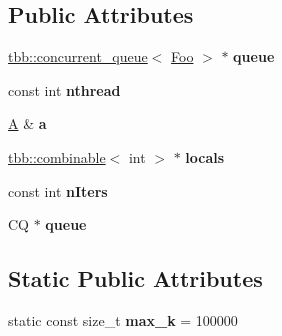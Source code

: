 \subsection*{Public Attributes}
\begin{DoxyCompactItemize}
\item 
\hypertarget{classBody_a8a064e323399c07b9484f6f0250fc070}{}\hyperlink{classtbb_1_1concurrent__queue}{tbb\+::concurrent\+\_\+queue}$<$ \hyperlink{structFoo}{Foo} $>$ $\ast$ {\bfseries queue}\label{classBody_a8a064e323399c07b9484f6f0250fc070}

\item 
\hypertarget{classBody_ad701533718b2c5ebe64a2340f4fb0ff4}{}const int {\bfseries nthread}\label{classBody_ad701533718b2c5ebe64a2340f4fb0ff4}

\item 
\hypertarget{classBody_a7b81b19bedf244d08b2754175b59866b}{}\hyperlink{structA}{A} \& {\bfseries a}\label{classBody_a7b81b19bedf244d08b2754175b59866b}

\item 
\hypertarget{classBody_a61fc621b5dc7142f164d30a1a13fa82c}{}\hyperlink{classtbb_1_1combinable}{tbb\+::combinable}$<$ int $>$ $\ast$ {\bfseries locals}\label{classBody_a61fc621b5dc7142f164d30a1a13fa82c}

\item 
\hypertarget{classBody_a0a6746a915f8730b8e0c4c62853d2429}{}const int {\bfseries n\+Iters}\label{classBody_a0a6746a915f8730b8e0c4c62853d2429}

\item 
\hypertarget{classBody_a9ea263bf574596c4b6975220031781ab}{}C\+Q $\ast$ {\bfseries queue}\label{classBody_a9ea263bf574596c4b6975220031781ab}

\end{DoxyCompactItemize}
\subsection*{Static Public Attributes}
\begin{DoxyCompactItemize}
\item 
\hypertarget{classBody_a1b8f3aa8e0ffd8e5fa24666882397354}{}static const size\+\_\+t {\bfseries max\+\_\+k} = 100000\label{classBody_a1b8f3aa8e0ffd8e5fa24666882397354}

\end{DoxyCompactItemize}


